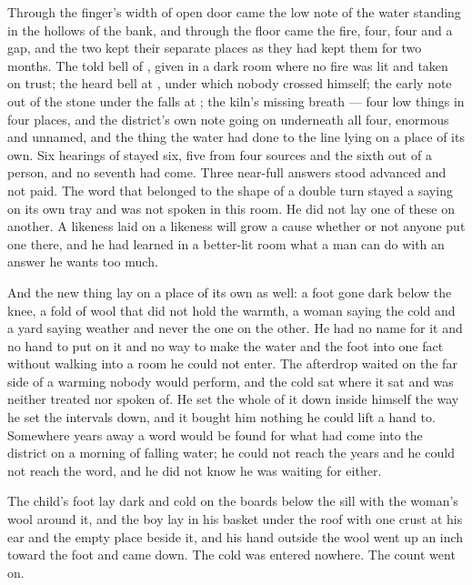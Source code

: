 Through the finger's width of open door came the low note of the water standing in the hollows of the bank, and through the floor came the fire, four, four and a gap, and the two kept their separate places as they had kept them for two months. The told bell of , given in a dark room where no fire was lit and taken on trust; the heard bell at , under which nobody crossed himself; the early note out of the stone under the falls at ; the kiln's missing breath — four low things in four places, and the district's own note going on underneath all four, enormous and unnamed, and the thing the water had done to the line lying on a place of its own. Six hearings of  stayed six, five from four sources and the sixth out of a person, and no seventh had come. Three near-full answers stood advanced and not paid. The word that belonged to the shape of a double turn stayed a saying on its own tray and was not spoken in this room. He did not lay one of these on another. A likeness laid on a likeness will grow a cause whether or not anyone put one there, and he had learned in a better-lit room what a man can do with an answer he wants too much.

And the new thing lay on a place of its own as well: a foot gone dark below the knee, a fold of wool that did not hold the warmth, a woman saying the cold and a yard saying weather and never the one on the other. He had no name for it and no hand to put on it and no way to make the water and the foot into one fact without walking into a room he could not enter. The afterdrop waited on the far side of a warming nobody would perform, and the cold sat where it sat and was neither treated nor spoken of. He set the whole of it down inside himself the way he set the intervals down, and it bought him nothing he could lift a hand to. Somewhere years away a word would be found for what had come into the district on a morning of falling water; he could not reach the years and he could not reach the word, and he did not know he was waiting for either.

The child's foot lay dark and cold on the boards below the sill with the woman's wool around it, and the boy lay in his basket under the roof with one crust at his ear and the empty place beside it, and his hand outside the wool went up an inch toward the foot and came down. The cold was entered nowhere. The count went on.

